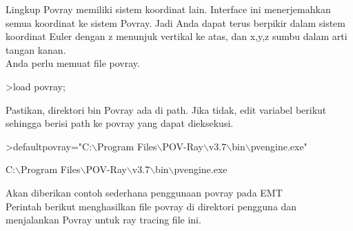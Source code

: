 \documentclass[a4paper,10pt]{article}
\begin{document}
\begin{eulernotebook}
\begin{eulercomment}
\begin{eulercomment}
\begin{eulercomment}
\begin{eulercomment}
\begin{eulercomment}
\begin{eulercomment}
\begin{eulercomment}
\begin{eulercomment}
\begin{eulercomment}
\begin{eulercomment}
\begin{eulercomment}
\begin{eulercomment}
\begin{eulercomment}
Lingkup Povray memiliki sistem koordinat lain. Interface ini
menerjemahkan semua koordinat ke sistem Povray. Jadi Anda dapat terus
berpikir dalam sistem koordinat Euler dengan z menunjuk vertikal ke
atas, dan x,y,z sumbu dalam arti tangan kanan.\\
Anda perlu memuat file povray.
\end{eulercomment}
\begin{eulerprompt}
>load povray;
\end{eulerprompt}
\begin{eulercomment}
Pastikan, direktori bin Povray ada di path. Jika tidak, edit variabel
berikut sehingga berisi path ke povray yang dapat dieksekusi.
\end{eulercomment}
\begin{eulerprompt}
>defaultpovray="C:\(\backslash\)Program Files\(\backslash\)POV-Ray\(\backslash\)v3.7\(\backslash\)bin\(\backslash\)pvengine.exe"
\end{eulerprompt}
\begin{euleroutput}
  C:\(\backslash\)Program Files\(\backslash\)POV-Ray\(\backslash\)v3.7\(\backslash\)bin\(\backslash\)pvengine.exe
\end{euleroutput}
\begin{eulercomment}
Akan diberikan contoh sederhana penggunaan povray pada EMT\\
Perintah berikut menghasilkan file povray di direktori pengguna dan
menjalankan Povray untuk ray tracing file ini.


\end{eulercomment}
\end{eulercomment}
\end{eulercomment}
\end{eulercomment}
\end{eulercomment}
\end{eulercomment}
\end{eulercomment}
\end{eulercomment}
\end{eulercomment}
\end{eulercomment}
\end{eulercomment}
\end{eulercomment}
\end{eulercomment}
\end{eulernotebook}
\end{document}

